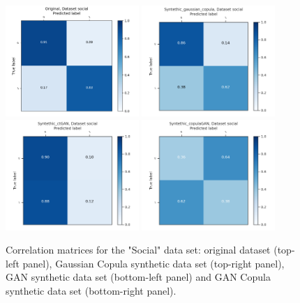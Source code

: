 \documentclass{article}
\begin{document}
\begin{figure}[h!]
	\centering
	\includegraphics[width=0.45\textwidth]{../ConfusionMatrixes/social_Original_.png}
	\includegraphics[width=0.45\textwidth]{../ConfusionMatrixes/social_Syntethic_gaussian_copula_.png}
	\includegraphics[width=0.45\textwidth]{../ConfusionMatrixes/social_Syntethic_ctGAN_.png}
	\includegraphics[width=0.45\textwidth]{../ConfusionMatrixes/social_Syntethic_copulaGAN_.png}

	\caption{Correlation matrices for the "Social" data set: original dataset (top-left panel), Gaussian Copula synthetic data set (top-right panel), GAN synthetic data set (bottom-left panel) and GAN Copula synthetic data set (bottom-right panel).  }
	\label{confusion_social}
\end{figure}
\end{document}
